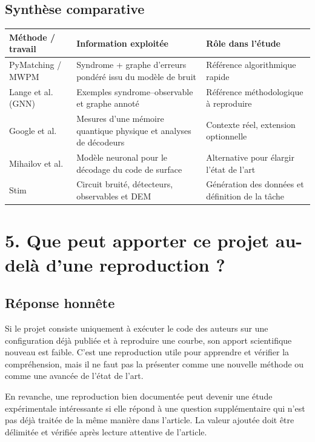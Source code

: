 \documentclass[11pt,a4paper]{article}
\begin{document}
\subsection{Synthèse comparative}

\begin{center}
\small
\begin{tabularx}{\textwidth}{p{2.5cm} X X}
\toprule
Méthode / travail & Information exploitée & Rôle dans l'étude \\
\midrule
PyMatching / MWPM & Syndrome + graphe d'erreurs pondéré issu du modèle de bruit
& Référence algorithmique rapide \\
Lange et al. (GNN) & Exemples syndrome--observable et graphe annoté
& Référence méthodologique à reproduire \\
Google et al. & Mesures d'une mémoire quantique physique et analyses de décodeurs
& Contexte réel, extension optionnelle \\
Mihailov et al. & Modèle neuronal pour le décodage du code de surface
& Alternative pour élargir l'état de l'art \\
Stim & Circuit bruité, détecteurs, observables et DEM
& Génération des données et définition de la tâche \\
\bottomrule
\end{tabularx}
\end{center}

\section{5. Que peut apporter ce projet au-delà d'une reproduction ?}

\subsection{Réponse honnête}

Si le projet consiste uniquement à exécuter le code des auteurs sur une
configuration déjà publiée et à reproduire une courbe, son apport
scientifique nouveau est faible. C'est une reproduction utile pour apprendre
et vérifier la compréhension, mais il ne faut pas la présenter comme une
nouvelle méthode ou comme une avancée de l'état de l'art.

En revanche, une reproduction bien documentée peut devenir une étude
expérimentale intéressante si elle répond à une question supplémentaire
qui n'est pas déjà traitée de la même manière dans l'article. La valeur
ajoutée doit être délimitée et vérifiée après lecture attentive de l'article.
\end{document}
